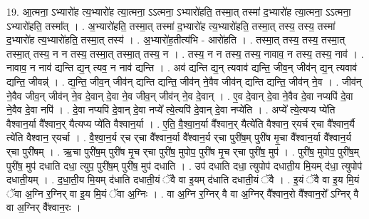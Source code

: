 \documentclass[17pt]{extarticle}
\begin{document}
19. आ॒त्मना॒ ऽभ्यारो॑ह त्य॒भ्यारो॑ह त्या॒त्मना॒ ऽऽत्मना॒ ऽभ्यारो॑हति॒ तस्मा॒त् तस्मा॑ द॒भ्यारो॑ह त्या॒त्मना॒ ऽऽत्मना॒ ऽभ्यारो॑हति॒ तस्मा᳚त् । . अ॒भ्यारो॑हति॒ तस्मा॒त् तस्मा॑ द॒भ्यारो॑ह त्य॒भ्यारो॑हति॒ तस्मा॒त् तस्य॒ तस्य॒ तस्मा॑ द॒भ्यारो॑ह त्य॒भ्यारो॑हति॒ तस्मा॒त् तस्य॑ । . अ॒भ्यारो॑ह॒तीत्य॑भि - आरो॑हति । . तस्मा॒त् तस्य॒ तस्य॒ तस्मा॒त् तस्मा॒त् तस्य॒ न न तस्य॒ तस्मा॒त् तस्मा॒त् तस्य॒ न । . तस्य॒ न न तस्य॒ तस्य॒ नावाव॒ न तस्य॒ तस्य॒ नाव॑ । . नावाव॒ न नाव॑ द्यन्ति द्य॒न् त्यव॒ न नाव॑ द्यन्ति । . अव॑ द्यन्ति द्य॒न् त्यवाव॑ द्यन्ति॒ जीव॒न् जीव॑न् द्य॒न् त्यवाव॑ द्यन्ति॒ जीवन्न्॑ । . द्य॒न्ति॒ जीव॒न् जीव॑न् द्यन्ति द्यन्ति॒ जीव॑न् ने॒वैव जीव॑न् द्यन्ति द्यन्ति॒ जीव॑न् ने॒व । . जीव॑न् ने॒वैव जीव॒न् जीव॑न् ने॒व दे॒वान् दे॒वा ने॒व जीव॒न् जीव॑न् ने॒व दे॒वान् । . ए॒व दे॒वान् दे॒वा ने॒वैव दे॒वा नप्यपि॑ दे॒वा ने॒वैव दे॒वा नपि॑ । . दे॒वा नप्यपि॑ दे॒वान् दे॒वा नप्ये᳚ त्ये॒त्यपि॑ दे॒वान् दे॒वा नप्ये॑ति । . अप्ये᳚ त्ये॒त्यप्य प्ये॑ति वैश्वान॒र्या वै᳚श्वान॒र् यैत्यप्य प्ये॑ति वैश्वान॒र्या । . ए॒ति॒ वै॒श्वा॒न॒र्या वै᳚श्वान॒र् यैत्ये॑ति वैश्वान॒ र्‌यर्च र्‌चा वै᳚श्वान॒र्यै त्ये॑ति वैश्वान॒ र्‌यर्चा । . वै॒श्वा॒न॒र्य र्‌च र्‌चा वै᳚श्वान॒र्या वै᳚श्वान॒र्य र्‌चा पुरी॑ष॒म् पुरी॑ष मृ॒चा वै᳚श्वान॒र्या वै᳚श्वान॒र्य र्‌चा पुरी॑षम् । . ऋ॒चा पुरी॑ष॒म् पुरी॑ष मृ॒च र्‌चा पुरी॑ष॒ मुपोप॒ पुरी॑ष मृ॒च र्‌चा पुरी॑ष॒ मुप॑ । . पुरी॑ष॒ मुपोप॒ पुरी॑ष॒म् पुरी॑ष॒ मुप॑ दधाति दधा॒ त्युप॒ पुरी॑ष॒म् पुरी॑ष॒ मुप॑ दधाति । . उप॑ दधाति दधा॒ त्युपोप॑ दधाती॒य मि॒यम् द॑धा॒ त्युपोप॑ दधाती॒यम् । . द॒धा॒ती॒य मि॒यम् द॑धाति दधाती॒यं ॅवै वा इ॒यम् द॑धाति दधाती॒यं ॅवै । . इ॒यं ॅवै वा इ॒य मि॒यं ॅवा अ॒ग्नि र॒ग्निर् वा इ॒य मि॒यं ॅवा अ॒ग्निः । . वा अ॒ग्नि र॒ग्निर् वै वा अ॒ग्निर् वै᳚श्वान॒रो वै᳚श्वान॒रो᳚ ऽग्निर् वै वा अ॒ग्निर् वै᳚श्वान॒रः । \newline
\end{document}
